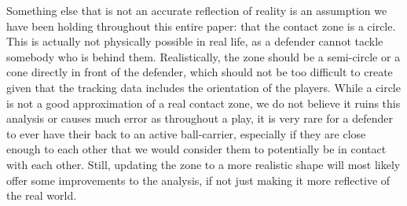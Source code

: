 \documentclass[
  12pt]{article}
\begin{document}
Something else that is not an accurate reflection of reality is an
assumption we have been holding throughout this entire paper: that the
contact zone is a circle. This is actually not physically possible in
real life, as a defender cannot tackle somebody who is behind them.
Realistically, the zone should be a semi-circle or a cone directly in
front of the defender, which should not be too difficult to create given
that the tracking data includes the orientation of the players. While a
circle is not a good approximation of a real contact zone, we do not
believe it ruins this analysis or causes much error as throughout a
play, it is very rare for a defender to ever have their back to an
active ball-carrier, especially if they are close enough to each other
that we would consider them to potentially be in contact with each
other. Still, updating the zone to a more realistic shape will most
likely offer some improvements to the analysis, if not just making it
more reflective of the real world.


\renewcommand\refname{References}
  
\end{document}
